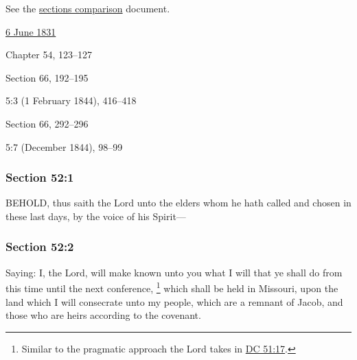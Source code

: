 		See the \href{https://drive.google.com/file/d/1goAvNz8jS4R8slYfMG_db55Ty2z_vmgK/view?usp=sharing}{sections comparison} document.
	
		\begin{compactdesc}
			\item[JSP] \hyperref[EMS-1831-JS-6-JUN-1831]{6 June 1831}
			\item[BC] Chapter 54, 123--127
			\item[DC 1835] Section 66, 192--195
			\item[TS] 5:3 (1 February 1844), 416--418
			\item[DC 1844] Section 66, 292--296
			\item[MS] 5:7 (December 1844), 98--99
		\end{compactdesc}

	\subsubsection{Section 52:1} %
		\label{DC52-1}

		BEHOLD, thus saith the Lord unto the elders whom he hath called and chosen in these last days, by the voice of his Spirit---


	\subsubsection{Section 52:2} %
		\label{DC52-2}

		Saying: I, the Lord, will make known unto you what I will that ye shall do from this time until the next conference,%
			\footnote{%
				Similar to the pragmatic approach the Lord takes in \hyperref[DC51-17]{DC 51:17}.
				}
		which shall be held in Missouri, upon the land which I will consecrate unto my people, which are a remnant of Jacob, and those who are heirs according to the covenant.


